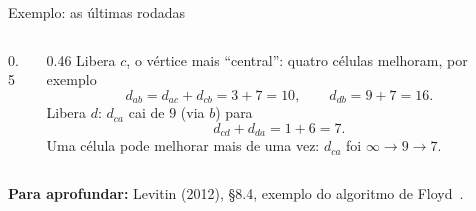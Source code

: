 \documentclass[aspectratio=169,xcolor=table]{beamer}
\newcommand{\matriz}[2]{%
  \foreach \r [count=\j from 0] in #1 {
    \node[font=\tiny\bfseries, gray!60!black] at ({\j*0.4},0.3) {\r};
    \node[font=\tiny\bfseries, gray!60!black] at (-0.36,{-\j*0.32}) {\r};
  }
  \foreach \lin [count=\i from 0] in #2
    \foreach \v [count=\j from 0] in \lin
      \node[cel] at ({\j*0.4},{-\i*0.32}) {\v};%
}
\newcommand{\marca}[3]{\fill[#3] ({#2*0.4-0.2},{-#1*0.32-0.16}) rectangle +(0.4,0.32);}
\newcommand{\titmat}[2]{\node[font=\scriptsize] at ({#1*0.2-0.2},0.72) {#2};}
\newcommand{\rotL}{a,b,c,d}
\newcommand{\Dtres}{{0,10,3,4},{2,0,5,6},{9,7,0,1},{6,16,9,0}}
\newcommand{\Dquatro}{{0,10,3,4},{2,0,5,6},{7,7,0,1},{6,16,9,0}}
\newcommand{\fonte}[1]{%
  \vfill
  {\tiny\color{gray!55!black}\textbf{Para aprofundar:} #1\par}%
}
\begin{document}
\begin{frame}{Exemplo: as últimas rodadas}
  \begin{columns}[c]
    \begin{column}{0.5\textwidth}
      \centering
    \end{column}
    \begin{column}{0.46\textwidth}
      \scriptsize Libera $c$, o vértice mais ``central'': quatro células melhoram, por exemplo
      \[ d_{ab} = d_{ac} + d_{cb} = 3 + 7 = 10,\qquad d_{db} = 9 + 7 = 16. \]
      Libera $d$: $d_{ca}$ cai de $9$ (via $b$) para
      \[ d_{cd} + d_{da} = 1 + 6 = 7. \]
      Uma célula pode melhorar mais de uma vez: $d_{ca}$ foi $\infty \to 9 \to 7$.
    \end{column}
  \end{columns}
  \fonte{Levitin (2012), \S 8.4, exemplo do algoritmo de Floyd~\cite{levitin2012introduction}.}
\end{frame}
\end{document}
